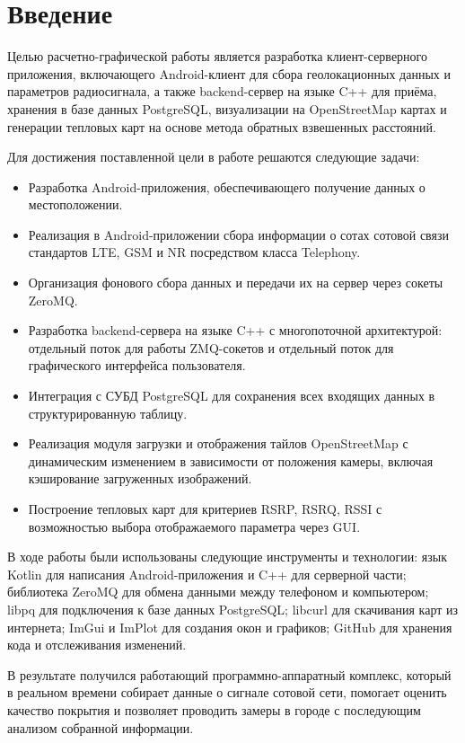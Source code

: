 \chapter*{Введение}
\label{ch:intro}
Целью расчетно-графической работы является разработка клиент-серверного приложения, включающего Android-клиент для сбора геолокационных данных и параметров радиосигнала, а также backend-сервер на языке C++ для приёма, хранения в базе данных PostgreSQL, визуализации на OpenStreetMap картах и генерации тепловых карт на основе метода обратных взвешенных расстояний.

Для достижения поставленной цели в работе решаются следующие задачи:
\begin{itemize}
    \item Разработка Android-приложения, обеспечивающего получение данных о местоположении.
    \item Реализация в Android-приложении сбора информации о сотах сотовой связи стандартов LTE, GSM и NR посредством класса Telephony.
    \item Организация фонового сбора данных и передачи их на сервер через сокеты ZeroMQ.
    \item Разработка backend-сервера на языке C++ с многопоточной архитектурой: отдельный поток для работы ZMQ-сокетов и отдельный поток для графического интерфейса пользователя.
    \item Интеграция с СУБД PostgreSQL для сохранения всех входящих данных в структурированную таблицу.
    \item Реализация модуля загрузки и отображения тайлов OpenStreetMap с динамическим изменением в зависимости от положения камеры, включая кэширование загруженных изображений.
    \item Построение тепловых карт для критериев RSRP, RSRQ, RSSI с возможностью выбора отображаемого параметра через GUI.
\end{itemize}

В ходе работы были использованы следующие инструменты и технологии:
язык Kotlin для написания Android-приложения и C++ для серверной части;
библиотека ZeroMQ для обмена данными между телефоном и компьютером;
libpq для подключения к базе данных PostgreSQL;
libcurl для скачивания карт из интернета;
ImGui и ImPlot для создания окон и графиков;
GitHub для хранения кода и отслеживания изменений.

В результате получился работающий программно-аппаратный комплекс, который в реальном времени собирает данные о сигнале сотовой сети, помогает оценить качество покрытия и позволяет проводить замеры в городе с последующим анализом собранной информации.
\endinput